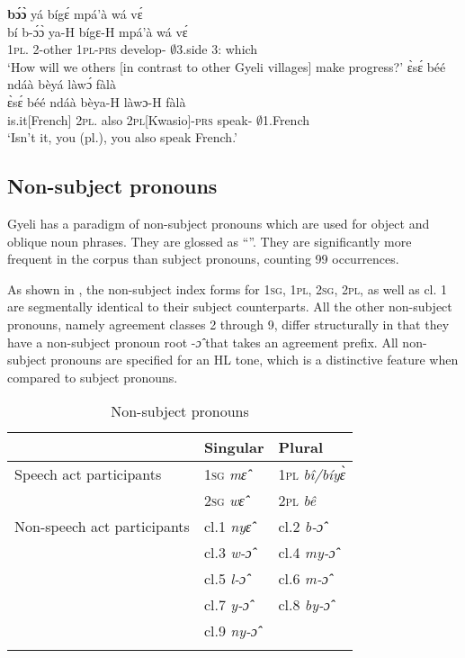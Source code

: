 \ea \label{SBJpro6}
   {\bfseries bɔ́ɔ̀} yá bígɛ́ mpá'à wá vɛ́ \\
           bí b-ɔ́ɔ̀ ya-H bígɛ-H mpá'à wá vɛ́ \\
           1\textsc{pl}.{\SBJ} 2-other 1\textsc{pl}-\textsc{prs} develop-{\R} $\emptyset$3.side 3:{\ATT} which  \\
    \trans `How will we others [in contrast to other Gyeli villages] make progress?'
\ex \label{SBJpro7}
  \glll  ɛ̀sɛ́ béé ndáà bèyá làwɔ́ fàlà \\
       ɛ̀sɛ́ béé ndáà bèya-H làwɔ-H fàlà \\
        is.it[French] 2\textsc{pl}.{\SBJ} also 2\textsc{pl}[Kwasio]-\textsc{prs} speak-{\R} $\emptyset$1.French  \\
    \trans `Isn't it, you (pl.), you also speak French.'
\z






\subsection{Non-subject pronouns}
\label{sec:OBJPRO}


Gyeli has a paradigm of non-subject pronouns which are used for object and oblique noun phrases. They are glossed as ``{\OBJ}''. They are significantly more frequent in the corpus than subject pronouns, counting 99 occurrences.

As shown in , the non-subject index forms for 1\textsc{sg}, 1\textsc{pl}, 2\textsc{sg}, 2\textsc{pl}, as well as cl. 1 are segmentally identical to their subject counterparts. All the other non-subject pronouns, namely agreement classes 2 through 9, differ structurally in that they have a non-subject pronoun root -{\itshape ɔ̂} that takes an agreement prefix. All non-subject pronouns are specified for an HL tone, which is a distinctive feature when compared to subject pronouns.

\begin{table}
\begin{tabular}{lll}
 \lsptoprule
 & Singular & Plural \\
\midrule
Speech act participants & 1\textsc{sg} {\itshape mɛ̂} & 1\textsc{pl} {\itshape bî/bíyɛ̀} \\
 & 2\textsc{sg} {\itshape wɛ̂} & 2\textsc{pl} {\itshape bê} \\
 \midrule
Non-speech act participants & cl.1 {\itshape nyɛ̂} & cl.2 {\itshape b-ɔ̂} \\
 & cl.3 {\itshape w-ɔ̂} & cl.4  {\itshape my-ɔ̂} \\
& cl.5 {\itshape l-ɔ̂} & cl.6 {\itshape m-ɔ̂} \\
 & cl.7 {\itshape y-ɔ̂} & cl.8 {\itshape by-ɔ̂} \\
&  cl.9 {\itshape ny-ɔ̂} & \\
 \lspbottomrule
\end{tabular}
\caption{Non-subject pronouns}
\label{Tab:ProOBJ}
\end{table}

